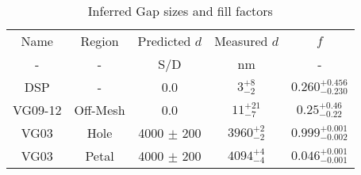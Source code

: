 \begin{table}[h!]
\caption{Inferred Gap sizes and fill factors \label{tbl_DerivedGapSizes}}
\begin{center}
    \begin{tabular}{ c c c c c }
    \hline
    Name & Region & Predicted $d$ & Measured $d$ & $f$ \\
    -  & - & S/D & nm & - \\
    \hline
    DSP & -    &   0.0  & $3^{+8}_{-2}$ & $0.260^{+0.456}_{-0.230}$\\
    VG09-12 & Off-Mesh    &   0.0  & $11^{+21}_{-7}$ & $0.25^{+0.46}_{-0.22}$\\
    VG03 & Hole    &   4000 $\pm$ 200  & $3960^{+2}_{-2}$ &  $0.999^{+0.001}_{-0.002}$\\
    VG03 & Petal   &   4000 $\pm$ 200  & $4094^{+4}_{-4}$ &  $0.046^{+0.001}_{-0.001}$\\
    \hline
    \end{tabular}
\end{center}
\end{table}